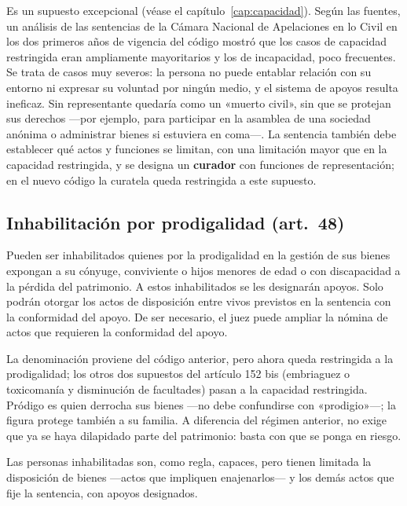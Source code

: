 \documentclass[12pt,oneside]{book}
\begin{document}
Es un supuesto excepcional (véase el capítulo~\ref{cap:capacidad}). Según las fuentes, un análisis de las sentencias de la Cámara Nacional de Apelaciones en lo Civil en los dos primeros años de vigencia del código mostró que los casos de capacidad restringida eran ampliamente mayoritarios y los de incapacidad, poco frecuentes. Se trata de casos muy severos: la persona no puede entablar relación con su entorno ni expresar su voluntad por ningún medio, y el sistema de apoyos resulta ineficaz. Sin representante quedaría como un «muerto civil», sin que se protejan sus derechos ---por ejemplo, para participar en la asamblea de una sociedad anónima o administrar bienes si estuviera en coma---. La sentencia también debe establecer qué actos y funciones se limitan, con una limitación mayor que en la capacidad restringida, y se designa un \textbf{curador} con funciones de representación; en el nuevo código la curatela queda restringida a este supuesto.

\subsection{Inhabilitación por prodigalidad (art.~48)}

\begin{regla}
Pueden ser inhabilitados quienes por la prodigalidad en la gestión de sus bienes expongan a su cónyuge, conviviente o hijos menores de edad o con discapacidad a la pérdida del patrimonio. A estos inhabilitados se les designarán apoyos. Solo podrán otorgar los actos de disposición entre vivos previstos en la sentencia con la conformidad del apoyo. De ser necesario, el juez puede ampliar la nómina de actos que requieren la conformidad del apoyo.
\end{regla}

La denominación proviene del código anterior, pero ahora queda restringida a la prodigalidad; los otros dos supuestos del artículo 152 bis (embriaguez o toxicomanía y disminución de facultades) pasan a la capacidad restringida. Pródigo es quien derrocha sus bienes ---no debe confundirse con «prodigio»---; la figura protege también a su familia. A diferencia del régimen anterior, no exige que ya se haya dilapidado parte del patrimonio: basta con que se ponga en riesgo.

Las personas inhabilitadas son, como regla, capaces, pero tienen limitada la disposición de bienes ---actos que impliquen enajenarlos--- y los demás actos que fije la sentencia, con apoyos designados.
\end{document}
